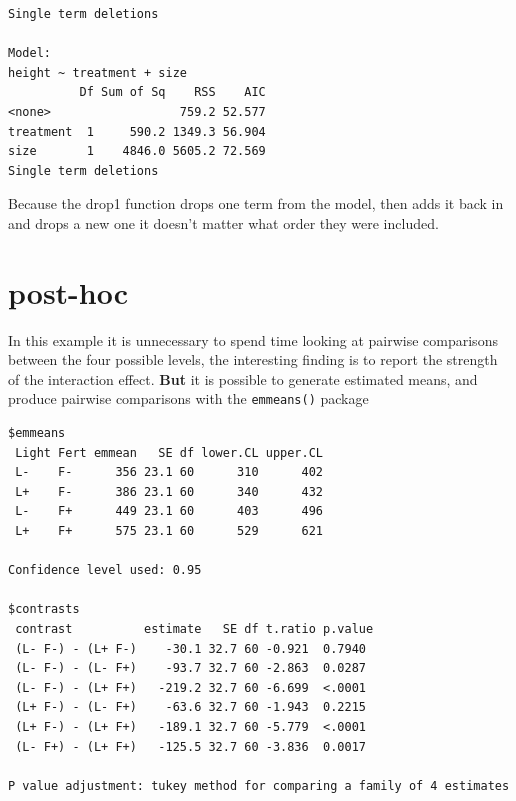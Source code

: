 \documentclass[
]{book}
\newenvironment{Shaded}{\begin{snugshade}}{\end{snugshade}}
\newcommand{\AttributeTok}[1]{\textcolor[rgb]{0.77,0.63,0.00}{#1}}
\newcommand{\CommentTok}[1]{\textcolor[rgb]{0.56,0.35,0.01}{\textit{#1}}}
\newcommand{\FunctionTok}[1]{\textcolor[rgb]{0.00,0.00,0.00}{#1}}
\newcommand{\NormalTok}[1]{#1}
\newcommand{\SpecialCharTok}[1]{\textcolor[rgb]{0.00,0.00,0.00}{#1}}
\begin{document}
\begin{verbatim}
Single term deletions

Model:
height ~ treatment + size
          Df Sum of Sq    RSS    AIC
<none>                  759.2 52.577
treatment  1     590.2 1349.3 56.904
size       1    4846.0 5605.2 72.569
Single term deletions
\end{verbatim}

Because the drop1 function drops one term from the model, then adds it back in and drops a new one it doesn't matter what order they were included.

\hypertarget{post-hoc}{%
\section{post-hoc}\label{post-hoc}}

In this example it is unnecessary to spend time looking at pairwise comparisons between the four possible levels, the interesting finding is to report the strength of the interaction effect. \textbf{But} it is possible to generate estimated means, and produce pairwise comparisons with the \texttt{emmeans()} package

\begin{Shaded}
\end{Shaded}

\begin{verbatim}
$emmeans
 Light Fert emmean   SE df lower.CL upper.CL
 L-    F-      356 23.1 60      310      402
 L+    F-      386 23.1 60      340      432
 L-    F+      449 23.1 60      403      496
 L+    F+      575 23.1 60      529      621

Confidence level used: 0.95 

$contrasts
 contrast          estimate   SE df t.ratio p.value
 (L- F-) - (L+ F-)    -30.1 32.7 60 -0.921  0.7940 
 (L- F-) - (L- F+)    -93.7 32.7 60 -2.863  0.0287 
 (L- F-) - (L+ F+)   -219.2 32.7 60 -6.699  <.0001 
 (L+ F-) - (L- F+)    -63.6 32.7 60 -1.943  0.2215 
 (L+ F-) - (L+ F+)   -189.1 32.7 60 -5.779  <.0001 
 (L- F+) - (L+ F+)   -125.5 32.7 60 -3.836  0.0017 

P value adjustment: tukey method for comparing a family of 4 estimates 
\end{verbatim}
\end{document}

